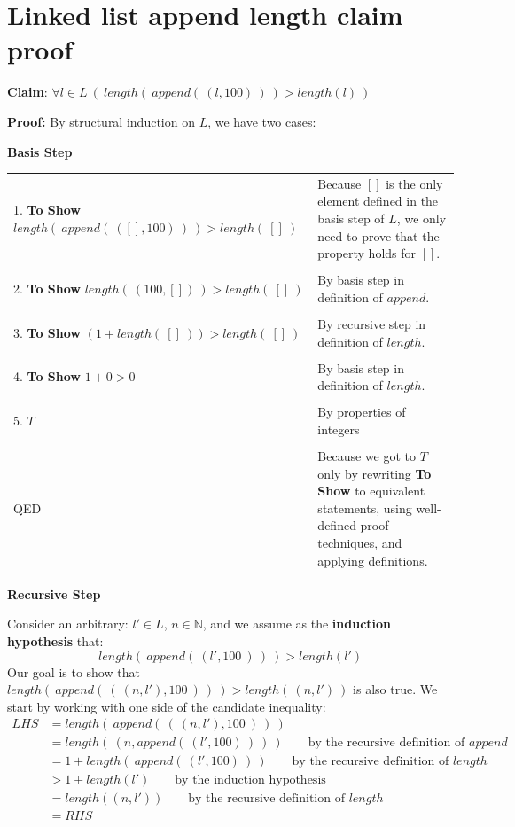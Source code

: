 \documentclass[12pt, oneside]{article}
\begin{document}
\section*{Linked list append length claim proof}


{\bf Claim}: $\forall l \in L ~ (~length(~append(~(l, 100)~)~) > length(l)~)$

{\bf Proof:} By structural induction on $L$, we have two cases:

{\bf Basis Step}

    \begin{tabular}{l p{3.5in}}
     1. \textbf{To Show} $length(~append(~([], 100)~)~) > length(~[]~)$
    & Because $[]$ is the only element defined in the basis step of $L$, 
    we only need to prove that the property holds for $[]$.\\
    &  \\
     2. \textbf{To Show} $length(~(100,[])~) > length(~[]~)$
    &  By basis step in definition of $append$.\\
    &  \\
     3. \textbf{To Show} $(1 +length(~[]~)) > length(~[]~)$
    &  By recursive step in definition of $length$.\\
    &  \\    
     4. \textbf{To Show} $1+0 > 0$
    &  By basis step in definition of $length$.\\
    &  \\    
    5. $T$
    & By properties of integers \\
    &  \\    
    QED & Because we got to $T$ only by rewriting \textbf{To Show} to equivalent statements, using well-defined proof techniques, and applying definitions. \\
    \end{tabular}

{\bf Recursive Step}

Consider an arbitrary: $l' \in L$, $n \in \mathbb{N}$, and we  assume
as the {\bf induction hypothesis} that:
\[
length(~append(~(l', 100~)~)~) > length(l')
\]
Our goal is to show that $length(~append( ~(~(n,l'), 100~)~)~) > length(~(n,l')~)$ is also true. 
We start by working with
one side of the candidate inequality:
\begin{align*}
LHS &= length(~append( ~(~ (n,l'), 100~)~)~) \\
&= length(~(n, append(~(l', 100)~)~ )~) \qquad \text{by the recursive definition of $append$}\\
&= 1 + length(~ append(~(l', 100)~) ~) \qquad \text{by the recursive definition of $length$}\\
&> 1+ length(l')  \qquad \text{by the induction hypothesis}\\
&= length( (n,l') )  \qquad \text{by the recursive definition of $length$}\\
&= RHS 
\end{align*} \vfill
\end{document}
